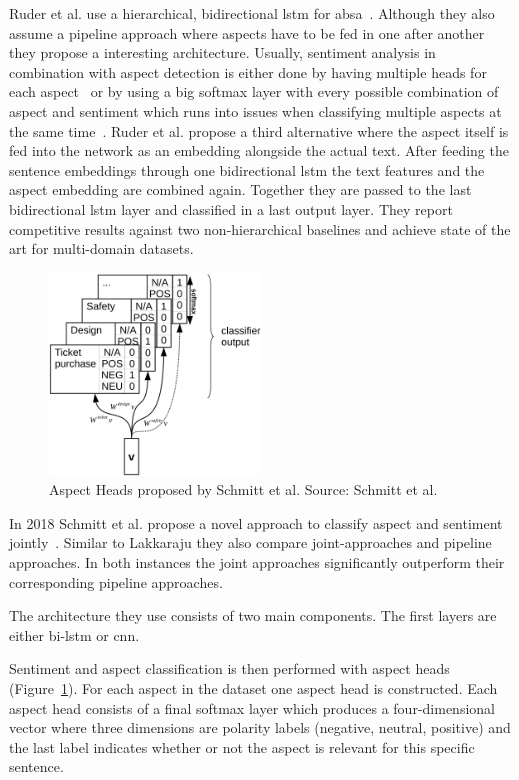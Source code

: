 Ruder et al. use a hierarchical, bidirectional \gls{lstm} for \gls{absa}~\cite{Ruder2016}. Although they also assume a pipeline approach where aspects have to be fed in one after another they propose a interesting architecture. Usually, sentiment analysis in combination with aspect detection is either done by having multiple heads for each aspect~\cite{Schmitt2018} or by using a big softmax layer with every possible combination of aspect and sentiment which runs into issues when classifying multiple aspects at the same time~\cite{Lakkaraju2014}. Ruder et al. propose a third alternative where the aspect itself is fed into the network as an embedding alongside the actual text. After feeding the sentence embeddings through one bidirectional \gls{lstm} the text features and the aspect embedding are combined again. Together they are passed to the last bidirectional \gls{lstm} layer and classified in a last output layer. They report competitive results against two non-hierarchical baselines and achieve state of the art for multi-domain datasets.
\medskip
\begin{figure}[htp]
	\centering
	\includegraphics[width=0.5\textwidth]{figures/02_relatedWork/02_jabsa}
	\caption{Aspect Heads proposed by Schmitt et al. Source: Schmitt et al.~\cite{Schmitt2018}}
	\label{fig:02_j-absa}
\end{figure}

In 2018 Schmitt et al. propose a novel approach to classify aspect and sentiment jointly~\cite{Schmitt2018}. Similar to Lakkaraju they also compare joint-approaches and pipeline approaches. In both instances the joint approaches significantly outperform their corresponding pipeline approaches. 

The architecture they use consists of two main components. The first layers are either bi-\gls{lstm} or \gls{cnn}. 

Sentiment and aspect classification is then performed with aspect heads {(Figure~\ref{fig:02_j-absa})}. For each aspect in the dataset one aspect head is constructed. Each aspect head consists of a final softmax layer which produces a four-dimensional vector where three dimensions are polarity labels {(negative, neutral, positive)} and the last label indicates whether or not the aspect is relevant for this specific sentence. 
\medskip

